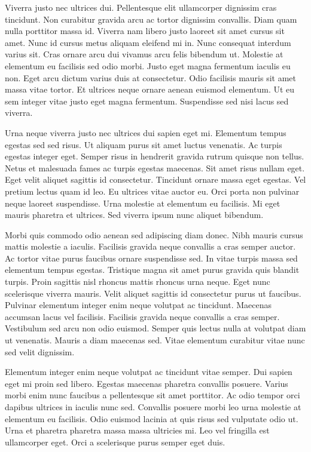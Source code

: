 \documentclass[11pt,a4paper]{article}
\begin{document}
Viverra justo nec ultrices dui. Pellentesque elit ullamcorper dignissim cras tincidunt. Non curabitur gravida arcu ac tortor dignissim convallis. Diam quam nulla porttitor massa id. Viverra nam libero justo laoreet sit amet cursus sit amet. Nunc id cursus metus aliquam eleifend mi in. Nunc consequat interdum varius sit. Cras ornare arcu dui vivamus arcu felis bibendum ut. Molestie at elementum eu facilisis sed odio morbi. Justo eget magna fermentum iaculis eu non. Eget arcu dictum varius duis at consectetur. Odio facilisis mauris sit amet massa vitae tortor. Et ultrices neque ornare aenean euismod elementum. Ut eu sem integer vitae justo eget magna fermentum. Suspendisse sed nisi lacus sed viverra.

Urna neque viverra justo nec ultrices dui sapien eget mi. Elementum tempus egestas sed sed risus. Ut aliquam purus sit amet luctus venenatis. Ac turpis egestas integer eget. Semper risus in hendrerit gravida rutrum quisque non tellus. Netus et malesuada fames ac turpis egestas maecenas. Sit amet risus nullam eget. Eget velit aliquet sagittis id consectetur. Tincidunt ornare massa eget egestas. Vel pretium lectus quam id leo. Eu ultrices vitae auctor eu. Orci porta non pulvinar neque laoreet suspendisse. Urna molestie at elementum eu facilisis. Mi eget mauris pharetra et ultrices. Sed viverra ipsum nunc aliquet bibendum.

Morbi quis commodo odio aenean sed adipiscing diam donec. Nibh mauris cursus mattis molestie a iaculis. Facilisis gravida neque convallis a cras semper auctor. Ac tortor vitae purus faucibus ornare suspendisse sed. In vitae turpis massa sed elementum tempus egestas. Tristique magna sit amet purus gravida quis blandit turpis. Proin sagittis nisl rhoncus mattis rhoncus urna neque. Eget nunc scelerisque viverra mauris. Velit aliquet sagittis id consectetur purus ut faucibus. Pulvinar elementum integer enim neque volutpat ac tincidunt. Maecenas accumsan lacus vel facilisis. Facilisis gravida neque convallis a cras semper. Vestibulum sed arcu non odio euismod. Semper quis lectus nulla at volutpat diam ut venenatis. Mauris a diam maecenas sed. Vitae elementum curabitur vitae nunc sed velit dignissim.

Elementum integer enim neque volutpat ac tincidunt vitae semper. Dui sapien eget mi proin sed libero. Egestas maecenas pharetra convallis posuere. Varius morbi enim nunc faucibus a pellentesque sit amet porttitor. Ac odio tempor orci dapibus ultrices in iaculis nunc sed. Convallis posuere morbi leo urna molestie at elementum eu facilisis. Odio euismod lacinia at quis risus sed vulputate odio ut. Urna et pharetra pharetra massa massa ultricies mi. Leo vel fringilla est ullamcorper eget. Orci a scelerisque purus semper eget duis.
\end{document}
